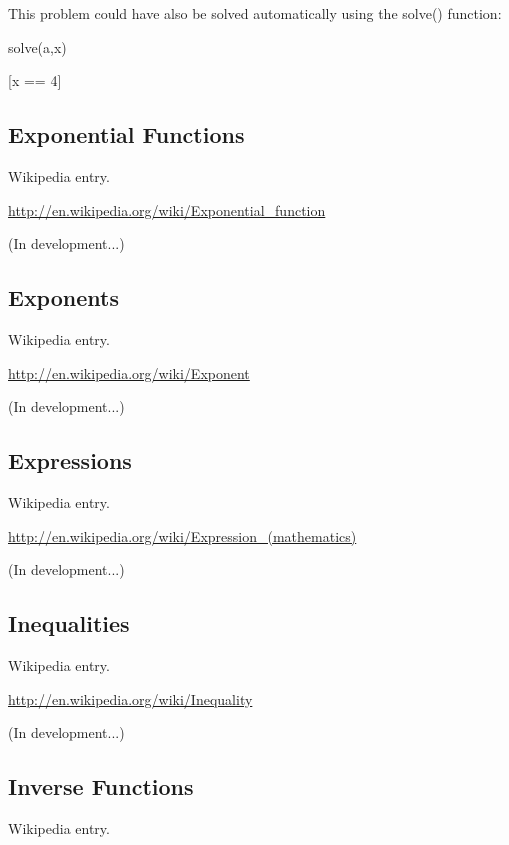 \documentclass[12pt,oneside]{book}
\begin{document}
This problem could have also be solved automatically using the solve() function:

{\textquotedbl}{\textquotedbl}{\textquotedbl}

solve(a,x)

{\textbar}

[x == 4]
\subsection[Exponential Functions]{Exponential Functions}

Wikipedia entry.

\href{http://en.wikipedia.org/wiki/Exponential_function}{http://en.wikipedia.org/wiki/Exponential\_function}

(In development...)

\subsection[Exponents]{Exponents}

Wikipedia entry.

\href{http://en.wikipedia.org/wiki/Exponent}{http://en.wikipedia.org/wiki/Exponent}

(In development...)

\subsection[Expressions]{Expressions}

Wikipedia entry.

\href{http://en.wikipedia.org/wiki/Expression_(mathematics)}{http://en.wikipedia.org/wiki/Expression\_(mathematics)}

(In development...)

\subsection[Inequalities]{Inequalities}

Wikipedia entry.

\href{http://en.wikipedia.org/wiki/Inequality}{http://en.wikipedia.org/wiki/Inequality}

(In development...)

\subsection[Inverse Functions]{Inverse Functions}

Wikipedia entry.
\end{document}
